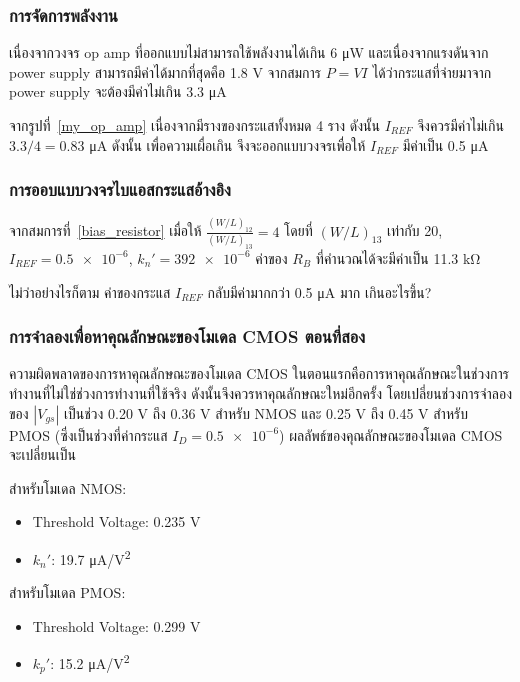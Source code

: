 \documentclass[a4paper, 11pt, oneside]{book} %
\begin{document}
\subsubsection{การจัดการพลังงาน}

เนื่องจากวงจร op amp ที่ออกแบบไม่สามารถใช้พลังงานได้เกิน 6 \si{\micro W} และเนื่องจากแรงดันจาก power supply สามารถมีค่าได้มากที่สุดคือ 1.8 V จากสมการ $P = VI$ ได้ว่ากระแสที่จ่ายมาจาก power supply จะต้องมีค่าไม่เกิน 3.3 \si{\micro A}

จากรูปที่~\ref{my_op_amp} เนื่องจากมีรางของกระแสทั้งหมด 4 ราง ดังนั้น $I_{REF}$ จึงควรมีค่าไม่เกิน $3.3/4 = 0.83$ \si{\micro A} ดังนั้น เพื่อความเผื่อเกิน จึงจะออกแบบวงจรเพื่อให้ $I_{REF}$ มีค่าเป็น 0.5 \si{\micro A}

\subsubsection{การออบแบบวงจรไบแอสกระแสอ้างอิง}

จากสมการที่~\ref{bias_resistor} เมื่อให้ $\frac{(W/L)_{12}}{(W/L)_{13}} = 4$ โดยที่ $(W/L)_{13}$ เท่ากับ 20, $I_{REF} = \num{0.5e-6}$, $k_{n}' = \num{392e-6}$ ค่าของ $R_B$ ที่คำนวณได้จะมีค่าเป็น 11.3 \si{\kilo\ohm}

ไม่ว่าอย่างไรก็ตาม ค่าของกระแส $I_{REF}$ กลับมีค่ามากกว่า 0.5 \si{\micro A} มาก เกินอะไรขึ้น?

\subsubsection{การจำลองเพื่อหาคุณลักษณะของโมเดล CMOS ตอนที่สอง}

ความผิดพลาดของการหาคุณลักษณะของโมเดล CMOS ในตอนแรกคือการหาคุณลักษณะในช่วงการทำงานที่ไม่ใช่ช่วงการทำงานที่ใช้จริง ดังนั้นจึงควรหาคุณลักษณะใหม่อีกครั้ง โดยเปลี่ยนช่วงการจำลองของ $|V_{gs}|$ เป็นช่วง 0.20 V ถึง 0.36 V สำหรับ NMOS และ 0.25 V ถึง 0.45 V สำหรับ PMOS (ซึ่งเป็นช่วงที่ค่ากระแส $I_D = \num{0.5e-6}$) ผลลัพธ์ของคุณลักษณะของโมเดล CMOS จะเปลี่ยนเป็น

สำหรับโมเดล NMOS:
\begin{itemize}
    \item Threshold Voltage: 0.235 V
    \item $k_{n}'$: 19.7 \si{\micro A/V^2}
\end{itemize}

สำหรับโมเดล PMOS:
\begin{itemize}
    \item Threshold Voltage: 0.299 V
    \item $k_{p}'$: 15.2 \si{\micro A/V^2}
\end{itemize}
\end{document}
